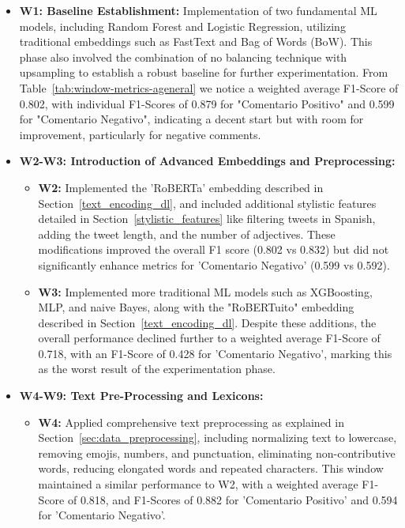 \newpage

\begin{itemize}
    \item \textbf{W1: Baseline Establishment:} Implementation of two fundamental ML models, including Random Forest and Logistic Regression, utilizing traditional embeddings such as FastText and Bag of Words (BoW). This phase also involved the combination of no balancing technique with upsampling to establish a robust baseline for further experimentation. From Table~\ref{tab:window-metrics-ageneral} we notice a weighted average F1-Score of 0.802, with individual F1-Scores of 0.879 for "Comentario Positivo" and 0.599 for "Comentario Negativo", indicating a decent start but with room for improvement, particularly for negative comments.

    
    \item \textbf{W2-W3: Introduction of Advanced Embeddings and Preprocessing:}
        \begin{itemize}
            \item \textbf{W2:} Implemented the 'RoBERTa' embedding described in Section~\ref{text_encoding_dl}, and included additional stylistic features detailed in Section~\ref{stylistic_features} like filtering tweets in Spanish, adding the tweet length, and the number of adjectives. These modifications improved the overall F1 score (0.802 vs 0.832) but did not significantly enhance metrics for 'Comentario Negativo' (0.599 vs 0.592). 

            \item \textbf{W3:} Implemented more traditional ML models such as XGBoosting, MLP, and naive Bayes, along with the "RoBERTuito" embedding described in Section~\ref{text_encoding_dl}. Despite these additions, the overall performance declined further to a weighted average F1-Score of 0.718, with an F1-Score of 0.428 for 'Comentario Negativo', marking this as the worst result of the experimentation phase.
        \end{itemize}

    \item \textbf{W4-W9: Text Pre-Processing and Lexicons:}
        \begin{itemize}
            \item \textbf{W4:} Applied comprehensive text preprocessing as explained in Section~\ref{sec:data_preprocessing}, including normalizing text to lowercase, removing emojis, numbers, and punctuation, eliminating non-contributive words, reducing elongated words and repeated characters. This window maintained a similar performance to W2, with a weighted average F1-Score of 0.818, and F1-Scores of 0.882 for 'Comentario Positivo' and 0.594 for 'Comentario Negativo'.
        

\end{itemize}
\end{itemize}
